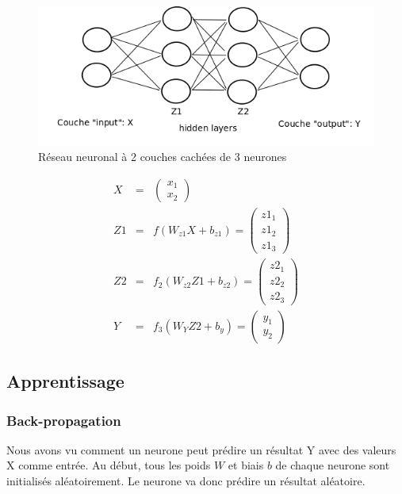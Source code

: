 \documentclass[11pt,a4paper]{report}
\begin{document}
    \newpage
    \begin{figure}[!h]
    \center
    \includegraphics[scale=0.74]{ressources/nn_presentation_3.png}
    \caption{Réseau neuronal à 2 couches cachées de 3 neurones}
    \end{figure} 
    
    \begin{eqnarray}
    X &=& \begin{pmatrix} x_1 \\ x_2  \end{pmatrix}     \\
    Z1 &=& f\left(W_{z1}X+b_{z1}\right) = \begin{pmatrix} z1_{1} \\ z1_2 \\ z1_3  \end{pmatrix} \\
    Z2 &=& f_2\left(W_{z2}Z1+b_{z2}\right) = \begin{pmatrix} z2_{1} \\ z2_2 \\ z2_3  \end{pmatrix} \\
    Y &=& f_3\left( W_YZ2+b_y \right) = \begin{pmatrix} y_{1} \\ y_2  \end{pmatrix} 
    \end{eqnarray}
    

  \subsection{Apprentissage}
  
  \subsubsection{Back-propagation}
  
    \par Nous avons vu comment un neurone peut prédire un résultat Y avec des valeurs X comme entrée. Au début, tous les poids $W$ et biais $b$ de chaque neurone sont initialisés aléatoirement. Le neurone va donc prédire un résultat aléatoire. 
  
\end{document}
